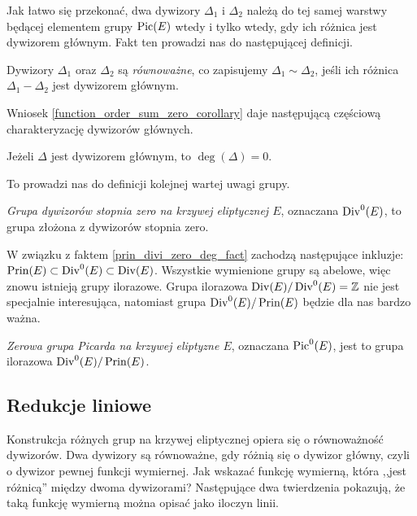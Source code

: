 Jak łatwo się przekonać,
dwa dywizory $\Delta_1$ i $\Delta_2$ należą do tej samej warstwy
będącej elementem grupy $\operatorname{Pic}(E)$
wtedy i tylko wtedy, gdy ich różnica jest dywizorem głównym.
Fakt ten prowadzi nas do następującej definicji.

\begin{definition}
Dywizory $\Delta_1$ oraz $\Delta_2$ są \emph{równoważne},
co zapisujemy $\Delta_1 \sim \Delta_2$,
jeśli ich różnica $\Delta_1 - \Delta_2$ jest dywizorem głównym.
\end{definition}

Wniosek \ref{function_order_sum_zero_corollary}
daje następującą częściową charakteryzację dywizorów głównych.

\begin{fact}\label{prin_divi_zero_deg_fact}
Jeżeli $\Delta$ jest dywizorem głównym,
to $\deg(\Delta) = 0$.
\end{fact}

To prowadzi nas do definicji kolejnej wartej uwagi grupy.

\begin{definition}
\emph{Grupa dywizorów stopnia zero na krzywej eliptycznej $E$},
oznaczana $\operatorname{Div}^0(E)$,
to grupa złożona z dywizorów stopnia zero.
\end{definition}

W związku z faktem \ref{prin_divi_zero_deg_fact}
zachodzą następujące inkluzje:
$\operatorname{Prin}(E) \subset \operatorname{Div}^0(E) \subset \operatorname{Div}(E)$.
Wszystkie wymienione grupy są abelowe,
więc znowu istnieją grupy ilorazowe.
Grupa ilorazowa $\operatorname{Div}(E) / \operatorname{Div}^0(E) = \mathbb{Z}$
nie jest specjalnie interesująca,
natomiast grupa $\operatorname{Div}^0(E) / \operatorname{Prin}(E)$
będzie dla nas bardzo ważna.

\begin{definition}
\emph{Zerowa grupa Picarda na krzywej eliptyzne $E$},
oznaczana $\operatorname{Pic}^0(E)$,
jest to grupa ilorazowa $\operatorname{Div}^0(E) / \operatorname{Prin}(E)$.
\end{definition}

\subsection*{Redukcje liniowe}

Konstrukcja różnych grup na krzywej eliptycznej opiera się
o równoważność dywizorów. Dwa dywizory są równoważne,
gdy różnią się o dywizor główny, czyli o dywizor pewnej funkcji wymiernej.
Jak wskazać funkcję wymierną, która ,,jest różnicą'' między dwoma dywizorami?
Następujące dwa twierdzenia pokazują, że taką funkcję wymierną
można opisać jako iloczyn linii.

